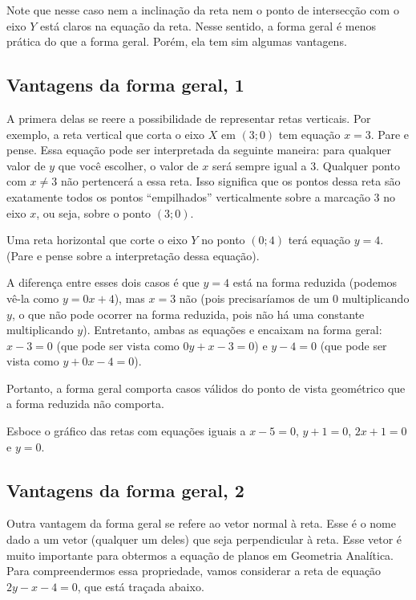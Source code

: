 \documentclass[main_estudante.tex]{subfiles}
\begin{document}
Note que nesse caso nem a inclinação da reta nem o ponto de intersecção com o eixo $Y$ está claros na equação da reta. Nesse sentido, a forma geral é menos prática do que a forma geral. Porém, ela tem sim algumas vantagens.

\subsection*{Vantagens da forma geral, 1}

A primera delas se reere a possibilidade de representar retas verticais. Por exemplo, a reta vertical que corta o eixo $X$ em $(3;0)$ tem equação $x=3$. Pare e pense. Essa equação pode ser interpretada da seguinte maneira: para qualquer valor de $y$ que você escolher, o valor de $x$ será sempre igual a $3$. Qualquer ponto com $x\neq3$ não pertencerá a essa reta. Isso significa que os pontos dessa reta são exatamente todos os pontos ``empilhados'' verticalmente sobre a marcação $3$ no eixo $x$, ou seja, sobre o ponto $(3;0)$.

Uma reta horizontal que corte o eixo $Y$ no ponto $(0;4)$ terá equação $y=4$. (Pare e pense sobre a interpretação dessa equação).

A diferença entre esses dois casos é que $y=4$ está na forma reduzida (podemos vê-la como $y=0x+4$), mas $x=3$ não (pois precisaríamos de um $0$ multiplicando $y$, o que não pode ocorrer na forma reduzida, pois não há uma constante multiplicando $y$). Entretanto, ambas as equações e encaixam na forma geral: $x-3=0$ (que pode ser vista como $0y+x-3=0$) e $y-4=0$ (que pode ser vista como $y+0x-4=0$).

Portanto, a forma geral comporta casos válidos do ponto de vista geométrico que a forma reduzida não comporta.

\begin{questao}
Esboce o gráfico das retas com equações iguais a $x-5=0$, $y+1=0$, $2x+1=0$ e $y=0$.
\end{questao}

\subsection*{Vantagens da forma geral, 2}

Outra vantagem da forma geral se refere ao vetor normal à reta. Esse é o nome dado a um vetor (qualquer um deles) que seja perpendicular à reta. Esse vetor é muito importante para obtermos a equação de planos em Geometria Analítica. Para compreendermos essa propriedade, vamos considerar a reta de equação $2y-x-4=0$, que está traçada abaixo.
\end{document}
